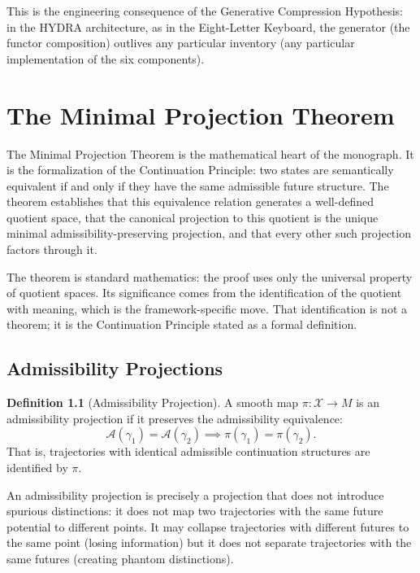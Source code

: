 \documentclass[12pt, oneside]{book}
\theoremstyle{flyxion}
\theoremstyle{definition}
\newtheorem{definition}[theorem]{Definition}
\begin{document}
This is the engineering consequence of the Generative
Compression Hypothesis: in the HYDRA architecture, as in
the Eight-Letter Keyboard, the generator (the functor
composition) outlives any particular inventory (any
particular implementation of the six components).

\chapter{The Minimal Projection Theorem}

The Minimal Projection Theorem is the mathematical heart
of the monograph. It is the formalization of the
Continuation Principle: two states are semantically
equivalent if and only if they have the same admissible
future structure. The theorem establishes that this
equivalence relation generates a well-defined quotient
space, that the canonical projection to this quotient
is the unique minimal admissibility-preserving projection,
and that every other such projection factors through it.

The theorem is standard mathematics: the proof uses only
the universal property of quotient spaces. Its significance
comes from the identification of the quotient with meaning,
which is the framework-specific move. That identification
is not a theorem; it is the Continuation Principle stated
as a formal definition.

\section{Admissibility Projections}

\begin{definition}[Admissibility Projection]
A smooth map $\pi : \mathcal{X} \to M$ is an admissibility
projection if it preserves the admissibility equivalence:
\[
\mathcal{A}(\gamma_1) = \mathcal{A}(\gamma_2) \implies
\pi(\gamma_1) = \pi(\gamma_2).
\]
That is, trajectories with identical admissible continuation
structures are identified by $\pi$.
\end{definition}

An admissibility projection is precisely a projection that
does not introduce spurious distinctions: it does not map
two trajectories with the same future potential to different
points. It may collapse trajectories with different futures
to the same point (losing information) but it does not
separate trajectories with the same futures (creating
phantom distinctions).
\end{document}
